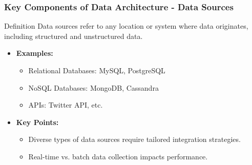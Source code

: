 \documentclass[aspectratio=169]{beamer}
\begin{document}
\begin{frame}[fragile]
    \frametitle{Key Components of Data Architecture - Data Sources}
    \begin{block}{Definition}
        Data sources refer to any location or system where data originates, including structured and unstructured data.
    \end{block}
    \begin{itemize}
        \item \textbf{Examples:}
        \begin{itemize}
            \item Relational Databases: MySQL, PostgreSQL
            \item NoSQL Databases: MongoDB, Cassandra
            \item APIs: Twitter API, etc.
        \end{itemize}
        \item \textbf{Key Points:}
        \begin{itemize}
            \item Diverse types of data sources require tailored integration strategies.
            \item Real-time vs. batch data collection impacts performance.
        \end{itemize}
    \end{itemize}
\end{frame}
\end{document}
